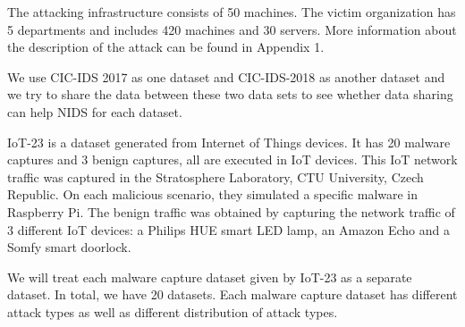 \begin{background}
The attacking infrastructure consists of 50 machines. The victim organization has 5 departments and includes 420 machines and 30 servers. More information about the description of the attack can be found in Appendix 1.

We use CIC-IDS 2017 as one dataset and CIC-IDS-2018 as another dataset and we try to share the data between these two data sets to see whether data sharing can help NIDS for each dataset.

IoT-23 is a dataset generated from Internet of Things devices. It has 20 malware captures and 3 benign captures, all are executed in IoT devices. This IoT network traffic was captured in the Stratosphere Laboratory, CTU University, Czech Republic. On each malicious scenario, they simulated a specific malware in Raspberry Pi. The benign traffic was obtained by capturing the network traffic of 3 different IoT devices: a Philips HUE smart LED lamp, an Amazon Echo and a Somfy smart doorlock.

We will treat each malware capture dataset given by IoT-23 as a separate dataset. In total, we have 20 datasets. Each malware capture dataset has different attack types as well as different distribution of attack types.

\end{background}
